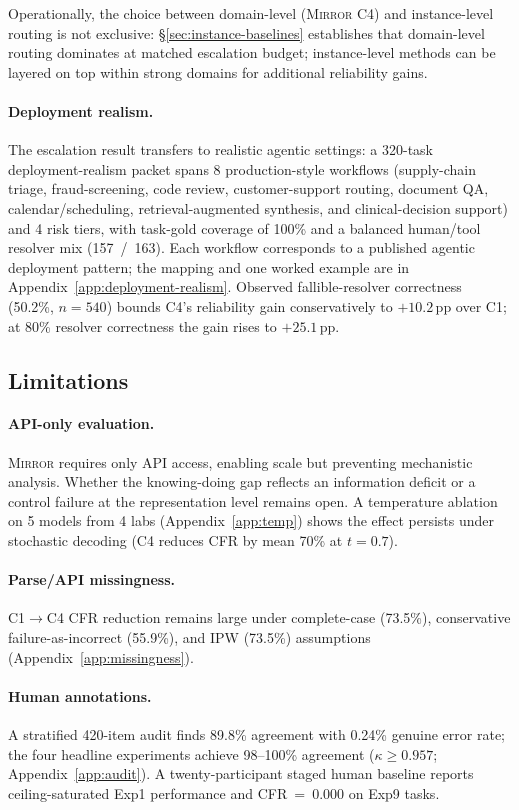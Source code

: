 \documentclass[10pt]{article}
\newcommand{\mirror}{\textsc{Mirror}}
\begin{document}
Operationally, the choice between domain-level (\mirror{} C4) and instance-level routing is not exclusive: §\ref{sec:instance-baselines} establishes that domain-level routing dominates at matched escalation budget; instance-level methods can be layered on top within strong domains for additional reliability gains.

\paragraph{Deployment realism.}
The escalation result transfers to realistic agentic settings: a 320-task deployment-realism packet spans 8 production-style workflows (supply-chain triage, fraud-screening, code review, customer-support routing, document QA, calendar/scheduling, retrieval-augmented synthesis, and clinical-decision support) and 4 risk tiers, with task-gold coverage of 100\% and a balanced human/tool resolver mix (157~/~163). Each workflow corresponds to a published agentic deployment pattern; the mapping and one worked example are in Appendix~\ref{app:deployment-realism}. Observed fallible-resolver correctness (50.2\%, $n\!=\!540$) bounds C4's reliability gain conservatively to $+10.2$\,pp over C1; at 80\% resolver correctness the gain rises to $+25.1$\,pp.

\subsection{Limitations}

\paragraph{API-only evaluation.}
\mirror{} requires only API access, enabling scale but preventing mechanistic analysis. Whether the knowing-doing gap reflects an information deficit or a control failure at the representation level remains open. A temperature ablation on 5 models from 4 labs (Appendix~\ref{app:temp}) shows the effect persists under stochastic decoding (C4 reduces CFR by mean 70\% at $t\!=\!0.7$).

\paragraph{Parse/API missingness.}
C1$\to$C4 CFR reduction remains large under complete-case (73.5\%), conservative failure-as-incorrect (55.9\%), and IPW (73.5\%) assumptions (Appendix~\ref{app:missingness}).

\paragraph{Human annotations.}
A stratified 420-item audit finds 89.8\% agreement with 0.24\% genuine error rate; the four headline experiments achieve 98--100\% agreement ($\kappa \geq 0.957$; Appendix~\ref{app:audit}). A twenty-participant staged human baseline reports ceiling-saturated Exp1 performance and CFR~=~0.000 on Exp9 tasks.
\end{document}
